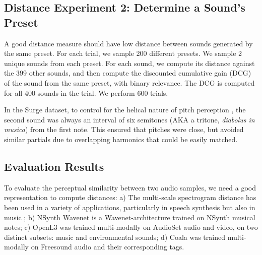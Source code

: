 






\subsection{Distance Experiment 2: Determine a Sound's Preset}
\label{sec:experiment2}

A good distance measure should have low distance between sounds generated by the same preset. For each trial, we sample 200 different presets. We sample 2 unique sounds from each preset. For each sound, we compute its distance against the 399 other sounds, and then compute the discounted cumulative gain (DCG) \cite{pmlr-v30-Wang13} of the sound from the same preset, with binary relevance. The DCG is computed for all 400 sounds in the trial. We perform 600 trials.

In the Surge dataset, to control for the helical nature of pitch perception \cite{shepard1982geometrical}, the second sound was always an interval of six semitones (AKA a tritone, {\em diabolus in musica}) from the first note. This ensured that pitches were close, but avoided similar partials due to overlapping harmonics that could be easily matched.

\subsection{Evaluation Results}

To evaluate the perceptual similarity between two audio samples, we need a good representation to compute distances: a) The multi-scale spectrogram distance has been used in a variety of applications, particularly in speech synthesis \cite{wang_neural_2019,DBLP:conf/icassp/YamamotoSK20} but also in music \cite{DBLP:journals/corr/abs-2008-01393,engel2020ddsp,dhariwal2020jukebox};
b) NSynth Wavenet \cite{engel2017neural} is a Wavenet-architecture trained on NSynth musical notes; c) OpenL3 \cite{cramer:learnmore:icassp:19} was  trained multi-modally on AudioSet audio and video, on two distinct subsets: music and environmental sounds; d) Coala \cite{drossos:icml:2020} was trained multi-modally on Freesound audio and their corresponding tags.

